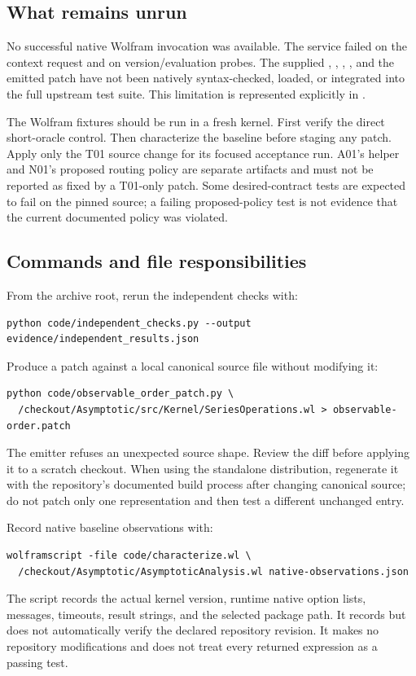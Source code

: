 \documentclass[11pt,letterpaper]{article}
\theoremstyle{definition}\newtheorem{definition}[proposition]{Definition}
\begin{document}
\subsection{What remains unrun}
No successful native Wolfram invocation was available. The service failed on
the context request and on version/evaluation probes. The supplied
, ,
, , and the emitted patch have not
been natively syntax-checked, loaded, or integrated into the full upstream test
suite. This limitation is represented explicitly in
.

The Wolfram fixtures should be run in a fresh kernel. First verify the direct
short-oracle control. Then characterize the baseline before staging any patch.
Apply only the T01 source change for its focused acceptance run. A01's helper
and N01's proposed routing policy are separate artifacts and must not be
reported as fixed by a T01-only patch. Some desired-contract tests are expected
to fail on the pinned source; a failing proposed-policy test is not evidence
that the current documented policy was violated.

\subsection{Commands and file responsibilities}
From the archive root, rerun the independent checks with:
\begin{lstlisting}
python code/independent_checks.py --output evidence/independent_results.json
\end{lstlisting}
Produce a patch against a local canonical source file without modifying it:
\begin{lstlisting}
python code/observable_order_patch.py \
  /checkout/Asymptotic/src/Kernel/SeriesOperations.wl > observable-order.patch
\end{lstlisting}
The emitter refuses an unexpected source shape. Review the diff before applying
it to a scratch checkout. When using the standalone distribution, regenerate it
with the repository's documented build process after changing canonical source;
do not patch only one representation and then test a different unchanged entry.

Record native baseline observations with:
\begin{lstlisting}
wolframscript -file code/characterize.wl \
  /checkout/Asymptotic/AsymptoticAnalysis.wl native-observations.json
\end{lstlisting}
The script records the actual kernel version, runtime native option lists,
messages, timeouts, result strings, and the selected package path. It records
but does not automatically verify the declared repository revision. It makes
no repository modifications and does not treat every returned expression as
a passing test.
\end{document}
